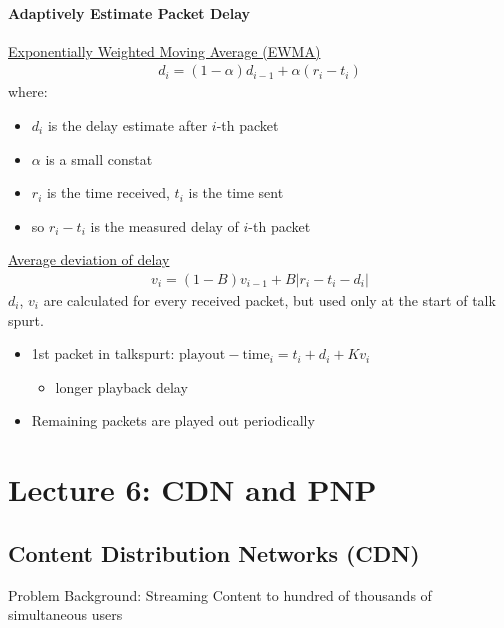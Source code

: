 \documentclass[a4paper]{article}
\begin{document}
\paragraph{Adaptively Estimate Packet Delay}
\mbox{}
\bigskip

\noindent \underline{Exponentially Weighted Moving Average (EWMA)}
\begin{align*}
    d_i = (1-\alpha)d_{i-1} + \alpha(r_i - t_i)
\end{align*}
where:
\begin{itemize}
    \item $d_i$ is the delay estimate after $i$-th packet
    \item $\alpha$ is a small constat
    \item $r_i$ is the time received, $t_i$ is the time sent
    \item so $r_i - t_i$ is the measured delay of $i$-th packet
    \end{itemize}

\bigskip

\noindent \underline{Average deviation of delay}
\begin{align*}
    v_i = (1-B)v_{i-1}+B|r_i-t_i-d_i|
\end{align*}
$d_i$, $v_i$ are calculated for every received packet, but used only at the start of talk spurt.
\begin{itemize}
    \item 1st packet in talkspurt: $ \text{playout}-\text{time}_i = t_i + d_i + Kv_i$
    \begin{itemize}[label=$\circ$]
        \item longer playback delay
    \end{itemize}
    \item Remaining packets are played out periodically
\end{itemize}

\newpage
\section{Lecture 6: CDN and PNP}
\subsection{Content Distribution Networks (CDN)}
Problem Background: Streaming Content to hundred of thousands of simultaneous users

\bigskip
\end{document}
